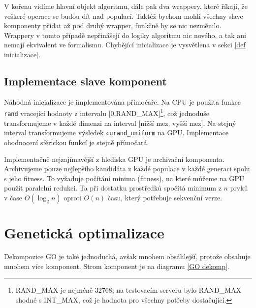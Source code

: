 V kořenu vidíme hlavní objekt algoritmu, dále pak dva wrappery, které říkají, že veškeré operace se budou dít nad populací. Taktéž bychom mohli všechny slave komponenty přidat až pod druhý wrapper, funkčně by se nic nezměnilo. Wrappery v tomto případě nepřinášejí do logiky algoritmu nic nového, a tak ani nemají ekvivalent ve formalismu. Chybějící inicializace je vysvětlena v sekci \ref{def inicializace}.

\subsection{Implementace slave komponent}

Náhodná inicializace je implementována přímočaře. Na CPU je použita funkce \texttt{rand} vracející hodnoty z intervalu [0,RAND\_MAX]\footnote{RAND\_MAX je nejméně 32768, na testovacím serveru bylo RAND\_MAX shodné s INT\_MAX, což je hodnota pro všechny potřeby dostačující.}, což jednoduše transformujeme v každé dimenzi na interval [nižší mez, vyšší mez]. Na stejný interval transformujeme výsledek \texttt{curand\_uniform} na GPU. Implementace ohodnocení sférickou funkcí je stejně přímočará.

Implementačně nejzajímavější z hlediska GPU je archivační komponenta. Archivujeme pouze nejlepšího kandidáta z každé populace v každé generaci spolu s jeho fitness. To vyžaduje počítání minima (fitness), na které můžeme na GPU použít paralelní redukci. Ta při dostatku prostředků spočítá minimum z $n$ prvků v čase $O(\log_2 n)$ oproti $O(n)$ času, který potřebuje sekvenční verze.

\section{Genetická optimalizace}

Dekompozice GO je také jednoduchá, avšak mnohem obsáhlejší, protože obsahuje mnohem více komponent. Strom komponent je na diagramu \ref{GO dekomp}.

